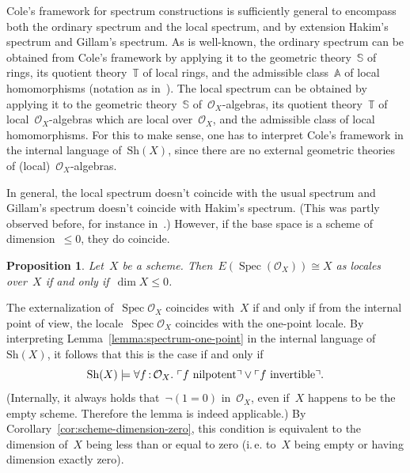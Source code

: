 \documentclass[10pt,reqno,a4paper]{amsbook}
\makeatletter
\theoremstyle{definition}
\theoremstyle{plain}
\newtheorem{prop}[defn]{Proposition}
\theoremstyle{remark}
\renewcommand{\O}{\mathcal{O}}
\newcommand{\Sh}{\mathrm{Sh}}
\DeclareMathOperator{\Spec}{Spec}
\newcommand{\?}{\,{:}\,}
\renewcommand{\_}{\mathpunct{.}\,}
\newcommand{\speak}[1]{\ulcorner\text{\textnormal{#1}}\urcorner}
\newcommand{\ie}{i.\,e.\@\xspace}
\renewenvironment{proof}[1][\proofname]{\par
  \pushQED{\qed}%
  \normalfont \topsep6\p@\@plus6\p@\relax
  \trivlist
  \item[\hskip\labelsep
        \itshape
    #1\@addpunct{.}]\ignorespaces
}{%
  \popQED\endtrivlist\@endpefalse
}
\makeatother
\begin{document}
Cole's framework for spectrum constructions is sufficiently general to
encompass both the ordinary spectrum and the local spectrum, and by extension
Hakim's spectrum and Gillam's spectrum. As is well-known, the ordinary spectrum
can be obtained from Cole's framework by applying it to the geometric
theory~$\mathbb{S}$ of rings, its quotient theory~$\mathbb{T}$ of local rings,
and the admissible class~$\mathbb{A}$ of local homomorphisms (notation as
in~\cite[Theorem~6.58]{johnstone:topos-theory}). The local spectrum can be
obtained by applying it to the geometric theory~$\mathbb{S}$
of~$\O_X$-algebras, its quotient theory~$\mathbb{T}$ of local~$\O_X$-algebras
which are local over~$\O_X$, and the admissible class of local homomorphisms.
For this to make sense, one has to interpret Cole's framework in the internal
language of~$\Sh(X)$, since there are no external geometric theories of
(local)~$\O_X$-algebras.

In general, the local spectrum doesn't coincide with the usual spectrum and
Gillam's spectrum doesn't coincide with Hakim's spectrum. (This was partly
observed before, for instance in~\cite[Remark~A.1.2]{chai:compactification}.) However, if the base
space is a scheme of dimension~$\leq 0$, they do coincide.

\begin{prop}\label{prop:local-spectrum-full-spectrum}
Let~$X$ be a scheme. Then~$E(\Spec(\O_X)) \cong X$ as locales
over~$X$ if and only if~$\dim X \leq 0$.\end{prop}
\begin{proof}The externalization of~$\Spec\O_X$ coincides with~$X$ if and only
if from the internal point of view, the locale~$\Spec\O_X$ coincides with the
one-point locale. By interpreting Lemma~\ref{lemma:spectrum-one-point} in the
internal language of~$\Sh(X)$, it follows that this is the case if and only if
\[ \Sh(X) \models \forall f\?\O_X\_ \speak{$f$ nilpotent} \vee \speak{$f$
invertible}. \]
(Internally, it always holds that~$\neg(1 = 0)$ in~$\O_X$, even if~$X$ happens
to be the empty scheme. Therefore the lemma is indeed applicable.) By
Corollary~\ref{cor:scheme-dimension-zero}, this condition is equivalent to the
dimension of~$X$ being less than or equal to zero (\ie to~$X$ being empty or
having dimension exactly zero).
\end{proof}
\end{document}

